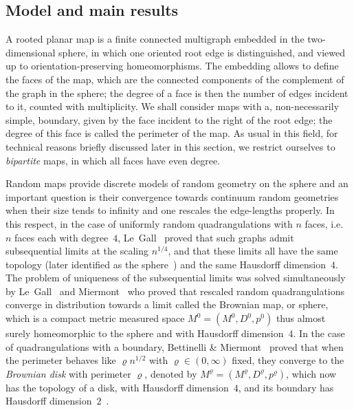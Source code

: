 \documentclass[10pt]{amsart}
\theoremstyle{definition}\newtheorem{defi}[theo]{Definition}\newtheorem{rema}[theo]{Remark}\newtheorem{exam}[theo]{Example}\newtheorem{exem}[theo]{Example}\newtheorem{nota}[theo]{Notation}
\newcommand{\1}{\ensembles{1}}
\newcommand{\Bmap}{M}
\newcommand{\dBmap}{D}
\newcommand{\pBmap}{p}
\providecommand{\?}{}
\begin{document}
\subsection{Model and main results}

A rooted planar map is a finite connected multigraph embedded in the two-dimensional sphere, in which one oriented root edge is distinguished, and viewed up to orientation-preserving homeomorphisms. The embedding allows to define the faces of the map, which are the connected components of the complement of the graph in the sphere; the degree of a face is then the number of edges incident to it, counted with multiplicity. We shall consider maps with a, non-necessarily simple, boundary, given by the face incident to the right of the root edge; the degree of this face is called the perimeter of the map. As usual in this field, for technical reasons briefly discussed later in this section, we restrict ourselves to \emph{bipartite} maps, in which all faces have even degree.

Random maps provide discrete models of random geometry on the sphere and an important question is their convergence towards continuum random geometries when their size tends to infinity and one rescales the edge-lengths properly. In this respect, in the case of uniformly random quadrangulations with $n$ faces, i.e. $n$ faces each with degree~$4$, Le~Gall~\cite{LG07} proved that such graphs admit subsequential limits at the scaling $n^{1/4}$, and that these limits all have the same topology (later identified as the sphere~\cite{LGP08, Mie08}) and the same Hausdorff dimension~$4$. The problem of uniqueness of the subsequential limits was solved simultaneously by Le~Gall~\cite{LG13} and Miermont~\cite{Mie13} who proved that rescaled random quadrangulations converge in distribution towards a limit called the Brownian map, or sphere, which is a compact metric measured space $\Bmap^0 = (\Bmap^0,\dBmap^0,\pBmap^0)$ thus almost surely homeomorphic to the sphere and with Hausdorff dimension~$4$. In the case of quadrangulations with a boundary, Bettinelli \& Miermont~\cite{BM17} proved that when the perimeter behaves like $\varrho n^{1/2}$ with $\varrho \in (0, \infty)$ fixed, they converge to the \emph{Brownian disk} with perimeter $\varrho$, denoted by $\Bmap^\varrho = (\Bmap^\varrho,\dBmap^\varrho, \pBmap^\varrho)$, which now has the topology of a disk, with Hausdorff dimension~$4$, and its boundary has Hausdorff dimension~$2$~\cite{Bet15}.
\end{document}
